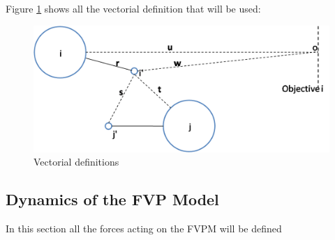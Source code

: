 \documentclass[english]{article}
\numberwithin{equation}{section}
\numberwithin{figure}{section}
\begin{document}
Figure \ref{fig:Pedestrian-vectors} shows all the vectorial definition
that will be used:

\begin{figure}[H]
\centering{}\includegraphics[scale=0.5]{pics/geometry}\protect\caption{\label{fig:Pedestrian-vectors}Vectorial definitions}
\end{figure}


\vspace{1cm}



\subsection{Dynamics of the FVP Model}

In this section all the forces acting on the FVPM will be defined 
\end{document}
